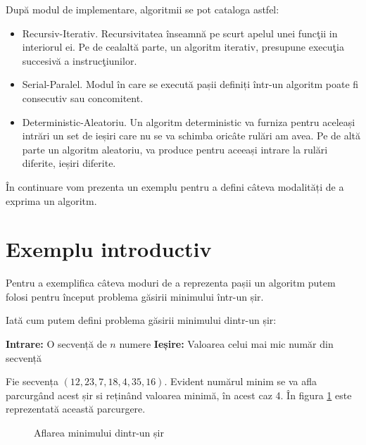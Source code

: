 După modul de implementare, algoritmii se pot cataloga astfel:

\begin{itemize}
	\item {Recursiv-Iterativ. Recursivitatea înseamnă pe scurt apelul unei funcţii in interiorul ei. Pe de cealaltă parte, un algoritm iterativ, presupune execuţia succesivă a instrucţiunilor.}
	\item {Serial-Paralel. Modul în care se execută pașii definiți într-un algoritm poate fi consecutiv sau concomitent.}
	\item {Deterministic-Aleatoriu. Un algoritm deterministic va furniza pentru aceleași intrări un set de ieșiri care nu se va schimba oricâte rulări am avea. Pe de altă parte un algoritm aleatoriu, va produce pentru aceeași intrare la rulări diferite, ieșiri diferite.}
\end{itemize}

În continuare vom prezenta un exemplu pentru a defini câteva modalități de a exprima un algoritm.

\section{Exemplu introductiv}

Pentru a exemplifica câteva moduri de a reprezenta pașii un algoritm putem folosi pentru început problema găsirii minimului într-un șir.

Iată cum putem defini problema găsirii minimului dintr-un șir:

\textbf{Intrare: } O secvență de $n$ numere 
\textbf{Ieșire: } Valoarea celui mai mic număr din secvență

Fie secvența $(12,23,7,18,4,35,16)$. Evident numărul minim se va afla parcurgând acest șir si reținând valoarea minimă, în acest caz 4.
În figura \ref{fig:minimum} este reprezentată această parcurgere.

\begin{figure} %
  \centering
  \caption{Aflarea minimului dintr-un șir} 
  \label{fig:minimum}
\end{figure}

